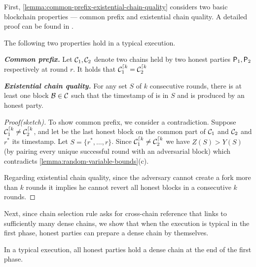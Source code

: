 First, \cref{lemma:common-prefix-existential-chain-quality} considers two basic blockchain properties --- common prefix and existential chain quality.
%
A detailed proof can be found in \cite{EPRINT:GarKiaLeo14}.

\begin{lemma} \label{lemma:common-prefix-existential-chain-quality}
    The following two properties hold in a typical execution.
    \begin{cccItemize}[nosep]
        \item \emph{\textbf{Common prefix.}} Let $\mathcal{C}_1, \mathcal{C}_2$ denote two chains held by two honest parties $\mathsf{P}_1, \mathsf{P}_2$ respectively at round $r$.
        It holds that $\mathcal{C}_1^{\lceil{k}} = \mathcal{C}_2^{\lceil{k}}$

        \item \emph{\textbf{Existential chain quality.}} For any set $S$ of $k$ consecutive rounds, there is at least one block $\mathcal{B} \in \mathcal{C}$ such that the timestamp of \block is in $S$ and \block is produced by an honest party.
    \end{cccItemize}
\end{lemma}

\begin{proof}[Proof(sketch)]
    To show common prefix, we consider a contradiction.
    Suppose $\mathcal{C}_1^{\lceil{k}} \neq \mathcal{C}_2^{\lceil{k}}$, and let \block be the last honest block on the common part of $\mathcal{C}_1$ and $\mathcal{C}_2$ and $r^*$ its timestamp.
    Let $S = \{r^*, \ldots, r\}$.
    Since $\mathcal{C}_1^{\lceil{k}} \neq \mathcal{C}_2^{\lceil{k}}$ we have $Z(S) > Y(S)$ (by pairing every unique successful round with an adversarial block) which contradicts \cref{lemma:random-variable-bounds}(c).

    Regarding existential chain quality, since the adversary cannot create a fork more than $k$ rounds it implies he cannot revert all honest blocks in a consecutive $k$ rounds.
\end{proof}

Next, since chain selection rule asks for cross-chain reference that links to sufficiently many dense chains, we show that when the execution is typical in the first phase, honest parties can prepare a dense chain by themselves.

\begin{lemma} \label{lemma:honest-only-density-chain}
    In a typical execution, all honest parties hold a dense chain at the end of the first phase.
\end{lemma}

